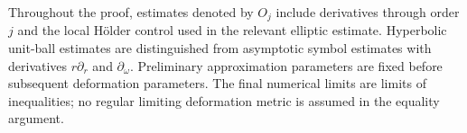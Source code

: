 Throughout the proof, estimates denoted by $O_j$ include derivatives
through order $j$ and the local H\"older control used in the relevant
elliptic estimate. Hyperbolic unit-ball estimates are distinguished from
asymptotic symbol estimates with derivatives $r\partial_r$ and
$\partial_\omega$. Preliminary approximation parameters are fixed before
subsequent deformation parameters. The final numerical limits are
limits of inequalities; no regular limiting deformation metric is
assumed in the equality argument.
